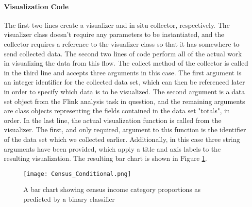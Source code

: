 \paragraph{Visualization Code}
The first two lines create a visualizer and in-situ collector, respectively. The visualizer class doesn't require any parameters to be instantiated, and the collector requires a reference to the visualizer class so that it has somewhere to send collected data. The second two lines of code perform all of the actual work in visualizing the data from this flow. The collect method of the collector is called in the third line and accepts three arguments in this case. The first argument is an integer identifier for the collected data set, which can then be referenced later in order to specify which data is to be visualized. The second argument is a data set object from the Flink analysis task in question, and the remaining arguments are class objects representing the fields contained in the data set "totals", in order. In the last line, the actual visualization function is called from the visualizer. The first, and only required, argument to this function is the identifier of the data set which we collected earlier. Additionally, in this case three string arguments have been provided, which apply a title and axis labels to the resulting visualization. The resulting bar chart is shown in Figure \ref{fig:conditional}.     

\begin{figure}
	\centering
	\texttt{[image: Census\_Conditional.png]}
	\caption{A bar chart showing census income category proportions as predicted by a binary classifier}
	\label{fig:conditional}
\end{figure}

